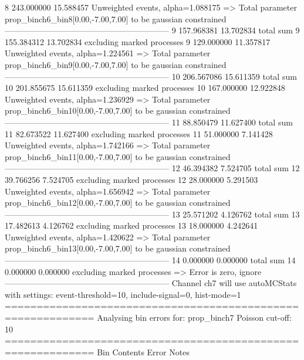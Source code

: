 8          243.000000      15.588457       Unweighted events, alpha=1.088175
  => Total parameter prop_binch6_bin8[0.00,-7.00,7.00] to be gaussian constrained
------------------------------------------------------------
9          157.968381      13.702834       total sum                     
9          155.384312      13.702834       excluding marked processes    
9          129.000000      11.357817       Unweighted events, alpha=1.224561
  => Total parameter prop_binch6_bin9[0.00,-7.00,7.00] to be gaussian constrained
------------------------------------------------------------
10         206.567086      15.611359       total sum                     
10         201.855675      15.611359       excluding marked processes    
10         167.000000      12.922848       Unweighted events, alpha=1.236929
  => Total parameter prop_binch6_bin10[0.00,-7.00,7.00] to be gaussian constrained
------------------------------------------------------------
11         88.850479       11.627400       total sum                     
11         82.673522       11.627400       excluding marked processes    
11         51.000000       7.141428        Unweighted events, alpha=1.742166
  => Total parameter prop_binch6_bin11[0.00,-7.00,7.00] to be gaussian constrained
------------------------------------------------------------
12         46.394382       7.524705        total sum                     
12         39.766256       7.524705        excluding marked processes    
12         28.000000       5.291503        Unweighted events, alpha=1.656942
  => Total parameter prop_binch6_bin12[0.00,-7.00,7.00] to be gaussian constrained
------------------------------------------------------------
13         25.571202       4.126762        total sum                     
13         17.482613       4.126762        excluding marked processes    
13         18.000000       4.242641        Unweighted events, alpha=1.420622
  => Total parameter prop_binch6_bin13[0.00,-7.00,7.00] to be gaussian constrained
------------------------------------------------------------
14         0.000000        0.000000        total sum                     
14         0.000000        0.000000        excluding marked processes    
  => Error is zero, ignore      
------------------------------------------------------------
Channel ch7 will use autoMCStats with settings: event-threshold=10, include-signal=0, hist-mode=1
============================================================
Analysing bin errors for: prop_binch7
Poisson cut-off: 10
============================================================
Bin        Contents        Error           Notes                         
